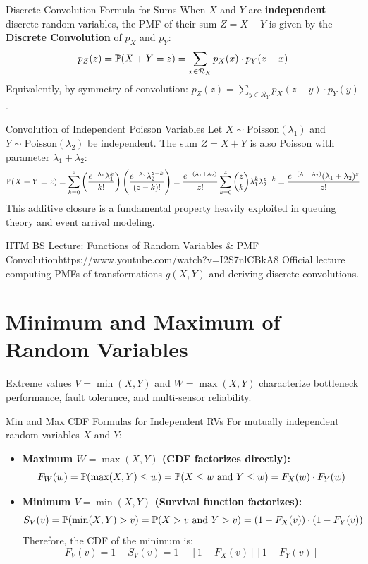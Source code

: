 \begin{formulabox}{Discrete Convolution Formula for Sums}
When $X$ and $Y$ are \textbf{independent} discrete random variables, the PMF of their sum $Z = X + Y$ is given by the \textbf{Discrete Convolution} of $p_X$ and $p_Y$:
$$p_Z(z) = \P(X + Y = z) = \sum_{x \in \mathcal{R}_X} p_X(x) \cdot p_Y(z - x)$$
Equivalently, by symmetry of convolution: $p_Z(z) = \sum_{y \in \mathcal{R}_Y} p_X(z - y) \cdot p_Y(y)$.
\end{formulabox}

\begin{examplebox}{Convolution of Independent Poisson Variables}
Let $X \sim \text{Poisson}(\lambda_1)$ and $Y \sim \text{Poisson}(\lambda_2)$ be independent. The sum $Z = X + Y$ is also Poisson with parameter $\lambda_1 + \lambda_2$:
$$\P(X + Y = z) = \sum_{k=0}^z \left(\frac{e^{-\lambda_1}\lambda_1^k}{k!}\right) \left(\frac{e^{-\lambda_2}\lambda_2^{z-k}}{(z-k)!}\right) = \frac{e^{-(\lambda_1+\lambda_2)}}{z!} \sum_{k=0}^z \binom{z}{k} \lambda_1^k \lambda_2^{z-k} = \frac{e^{-(\lambda_1+\lambda_2)}(\lambda_1+\lambda_2)^z}{z!}$$
This additive closure is a fundamental property heavily exploited in queuing theory and event arrival modeling.
\end{examplebox}

\begin{videocard}{IITM BS Lecture: Functions of Random Variables \& PMF Convolution}{https://www.youtube.com/watch?v=I2S7nlCBkA8}
Official lecture computing PMFs of transformations $g(X,Y)$ and deriving discrete convolutions.
\end{videocard}

\section{Minimum and Maximum of Random Variables}

Extreme values $V = \min(X, Y)$ and $W = \max(X, Y)$ characterize bottleneck performance, fault tolerance, and multi-sensor reliability.

\begin{formulabox}{Min and Max CDF Formulas for Independent RVs}
For mutually independent random variables $X$ and $Y$:
\begin{itemize}
    \item \textbf{Maximum $W = \max(X, Y)$ (CDF factorizes directly):}
    $$F_W(w) = \P(\max(X, Y) \le w) = \P(X \le w \text{ and } Y \le w) = F_X(w) \cdot F_Y(w)$$
    \item \textbf{Minimum $V = \min(X, Y)$ (Survival function factorizes):}
    $$S_V(v) = \P(\min(X, Y) > v) = \P(X > v \text{ and } Y > v) = (1 - F_X(v)) \cdot (1 - F_Y(v))$$
    Therefore, the CDF of the minimum is:
    $$F_V(v) = 1 - S_V(v) = 1 - [1 - F_X(v)][1 - F_Y(v)]$$
\end{itemize}
\end{formulabox}

